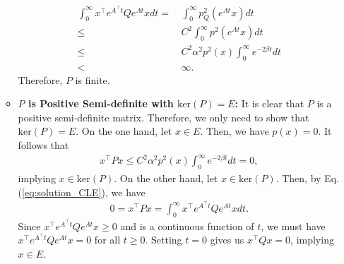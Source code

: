 \documentclass[11 pt]{article}
\begin{document}
\begin{itemize}
\begin{itemize}
			\begin{align*}
				\int_0^\infty x^\top e^{A^\top t}Qe^{At} xdt
				=\,&\int_0^\infty p_{Q}^2(e^{At} x) dt\\
				\leq \,&C^2\int_0^\infty p^2(e^{At} x) dt\\
				\leq \,&C^2 \alpha^2 p^2(x)\int_0^\infty e^{-2\beta t} dt\\
				<\,&\infty.
			\end{align*}
			Therefore, $P$ is finite.
			\item \textbf{$P$ is Positive Semi-definite with $\text{ker}(P)=E$:} It is clear that $P$ is a positive semi-definite matrix. Therefore, we only need to show that $\text{ker}(P)=E$. On the one hand, let $x\in E$. Then, we have $p(x)=0$. It follows that
			\begin{align*}
				x^\top P x\leq C^2 \alpha^2 p^2(x)\int_0^\infty e^{-2\beta t} dt=0,
			\end{align*}
			implying $x\in\text{ker}(P)$. On the other hand, let $x\in \text{ker}(P)$. Then, by Eq. (\ref{eq:solution_CLE}), we have
			\begin{align*}
				0=x^\top Px=\int_0^\infty x^\top e^{A^\top t}Qe^{At}x dt.
			\end{align*}
			Since $x^\top e^{A^\top t}Qe^{At}x\geq 0$ and is a continuous function of $t$, we must have $x^\top e^{A^\top t}Qe^{At}x=0$ for all $t\geq 0$. Setting $t=0$ gives us $x^\top Qx=0$, implying $x\in E$.
			

\end{itemize}
\end{itemize}
\end{document}
